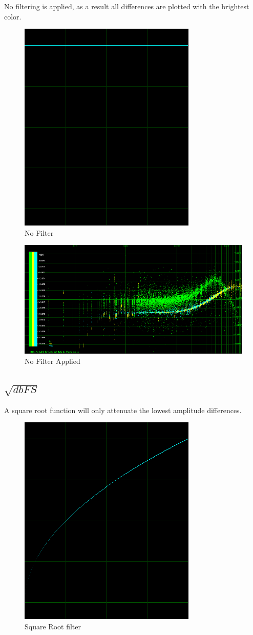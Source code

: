 \documentclass[10pt,a4paper]{report}
\begin{document}
No filtering is applied, as a result all differences are plotted with the brightest color. 

\begin{figure}[H]
	\centering
	\includegraphics[width=0.4\linewidth]{plots/BetaFunctionPlot_0}
	\caption[No Filter]{No Filter}
	\label{fig:betafunctionplot0}
\end{figure}

\begin{figure}[H]
	\centering
	\includegraphics[width=1\linewidth]{plots/BetaFunctionPlot_0_Data}
	\caption[No Filter]{No Filter Applied}
	\label{fig:betafunctionplot0data}
\end{figure}

\newpage
\subsection{$\sqrt{dbFS}$} 

A square root function will only attenuate the lowest amplitude differences.

\begin{figure}[H]
	\centering
	\includegraphics[width=0.4\linewidth]{plots/BetaFunctionPlot_1}
	\caption[Square Root filter]{Square Root filter}
	\label{fig:betafunctionplot1}
\end{figure}
\end{document}
